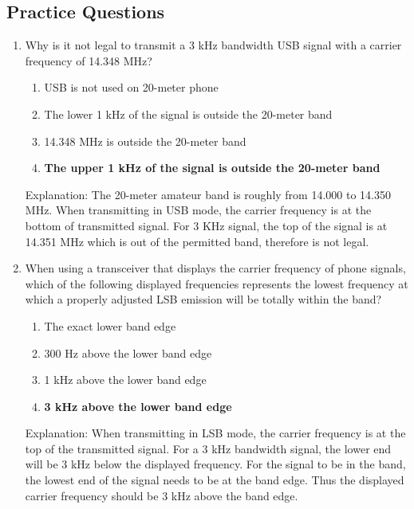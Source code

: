 \subsection*{Practice Questions}
\begin{enumerate}
    \item Why is it not legal to transmit a 3 kHz bandwidth USB signal with a carrier frequency of 14.348 MHz?
    \begin{enumerate}
        \item USB is not used on 20-meter phone
        \item  The lower 1 kHz of the signal is outside the 20-meter band
        \item  14.348 MHz is outside the 20-meter band
        \item  \textbf {The upper 1 kHz of the signal is outside the 20-meter band}
    \end{enumerate}
    \textcolor{myred}{Explanation:}
    The 20-meter amateur band is roughly from 14.000 to 14.350 MHz. When transmitting in USB mode, the carrier frequency is at the bottom of transmitted signal. For 3 KHz signal, the top of the signal is at 14.351 MHz which is out of the permitted band, therefore is not legal.
        
    \item When using a transceiver that displays the carrier frequency of phone signals, which of the following displayed frequencies represents the lowest frequency at which a properly adjusted LSB emission will be totally within the band?
    \begin{enumerate}
        \item The exact lower band edge
        \item  300 Hz above the lower band edge
        \item  1 kHz above the lower band edge
        \item \textbf {3 kHz above the lower band edge}
    \end{enumerate}
    \textcolor{myred}{Explanation:}
    When transmitting in LSB mode, the carrier frequency is at the top of the transmitted signal. For a 3 kHz bandwidth signal, the lower end will be 3 kHz below the displayed frequency. For the signal to be in the band, the lowest end of the signal needs to be at the band edge. Thus the displayed carrier frequency should be 3 kHz above the band edge.
    

\end{enumerate}
